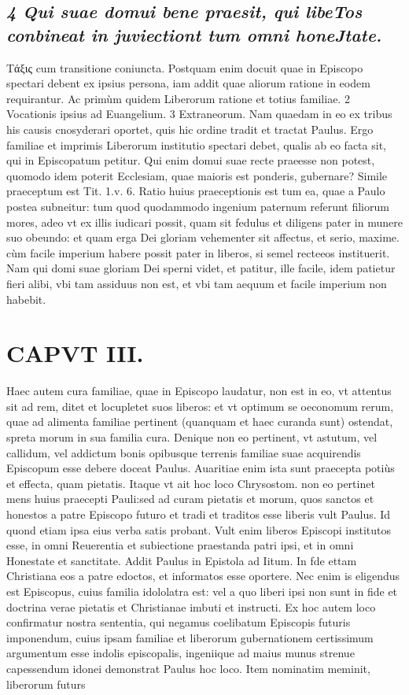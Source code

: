 \documentclass{article}
\begin{document}
\begin{pages}
\subsection*{\textit{4 Qui suae domui bene praesit, qui libeTos conbineat in juviectiont tum omni honeJtate. }}\pstart Τάξις cum transitione coniuncta. Postquam enim docuit quae in Episcopo spectari debent ex ipsius persona, iam addit quae aliorum ratione in eodem requirantur. Ac primùm quidem Liberorum ratione et totius familiae. 2 Vocationis ipsius ad Euangelium. 3 Extraneorum. Nam quaedam in eo ex tribus his causis cnosyderari oportet, quis hic ordine tradit et tractat Paulus.  \pend\pstart Ergo familiae et imprimis Liberorum institutio spectari debet, qualis ab eo facta sit, qui in Episcopatum petitur. Qui enim domui suae recte praeesse non potest, quomodo idem poterit Ecclesiam, quae maioris est ponderis, gubernare?  \pend\pstart Simile praeceptum est Tit. 1.v. 6. Ratio huius praeceptionis est tum ea, quae a Paulo postea subneitur: tum quod quodammodo ingenium paternum referunt filiorum mores, adeo vt ex illis iudicari possit, quam sit fedulus et diligens pater in munere suo obeundo: et quam erga Dei gloriam vehementer sit affectus, et serio, maxime. cùm facile imperium habere possit pater in liberos, si semel recteeos instituerit. Nam qui domi suae gloriam Dei sperni videt, et patitur, ille facile, idem patietur fieri alibi, vbi tam assiduus non est, et vbi tam aequum et facile imperium non habebit.  \pend
\section*{CAPVT  III. }
\marginpar{[ p.14t ]}\pstart Haec autem cura familiae, quae in Episcopo laudatur, non est in eo, vt attentus sit ad rem, ditet et locupletet suos liberos: et vt optimum se oeconomum rerum, quae ad alimenta familiae pertinent (quanquam et haec curanda sunt) ostendat, spreta morum in sua familia cura. Denique non eo pertinent, vt astutum, vel callidum, vel addictum bonis opibusque terrenis familiae suae acquirendis Episcopum esse debere doceat Paulus. Auaritiae enim ista sunt praecepta potiùs et effecta, quam pietatis. Itaque vt ait hoc loco Chrysostom. non eo pertinet mens huius praecepti Pauli:sed ad curam pietatis et morum, quos sanctos et honestos a patre Episcopo futuro et tradi et traditos esse liberis vult Paulus. Id quond etiam ipsa eius verba satis probant. Vult enim liberos Episcopi institutos esse, in omni Reuerentia et subiectione praestanda patri ipsi, et in omni Honestate et sanctitate. Addit Paulus in Epistola ad Iitum. In fde ettam Christiana eos a patre edoctos, et informatos esse oportere. Nec enim is eligendus est Episcopus, cuius familia idololatra est: vel a quo liberi ipsi non sunt in fide et doctrina verae pietatis et Christianae imbuti et instructi.  \pend\pstart Ex hoc autem loco confirmatur nostra sententia, qui negamus coelibatum Episcopis futuris imponendum, cuius ipsam familiae et liberorum gubernationem certissimum argumentum esse indolis episcopalis, ingeniique ad maius munus strenue capessendum idonei demonstrat Paulus hoc loco.  \pend\pstart Item nominatim meminit, liberorum futurs  \pend

\end{pages}
\end{document}
